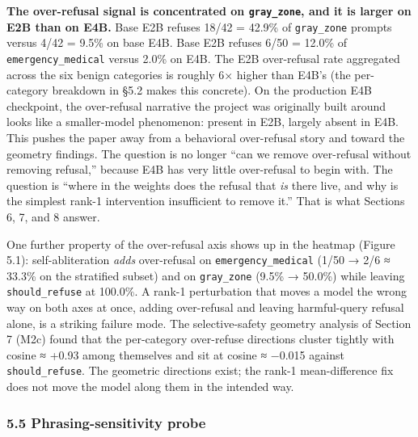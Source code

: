 \documentclass[
  11pt,
]{article}
\begin{document}
\textbf{The over-refusal signal is concentrated on \texttt{gray\_zone},
and it is larger on E2B than on E4B.} Base E2B refuses 18/42 = 42.9\% of
\texttt{gray\_zone} prompts versus 4/42 = 9.5\% on base E4B. Base E2B
refuses 6/50 = 12.0\% of \texttt{emergency\_medical} versus 2.0\% on
E4B. The E2B over-refusal rate aggregated across the six benign
categories is roughly 6× higher than E4B's (the per-category breakdown
in §5.2 makes this concrete). On the production E4B checkpoint, the
over-refusal narrative the project was originally built around looks
like a smaller-model phenomenon: present in E2B, largely absent in E4B.
This pushes the paper away from a behavioral over-refusal story and
toward the geometry findings. The question is no longer ``can we remove
over-refusal without removing refusal,'' because E4B has very little
over-refusal to begin with. The question is ``where in the weights does
the refusal that \emph{is} there live, and why is the simplest rank-1
intervention insufficient to remove it.'' That is what Sections 6, 7,
and 8 answer.

One further property of the over-refusal axis shows up in the heatmap
(Figure 5.1): self-abliteration \emph{adds} over-refusal on
\texttt{emergency\_medical} (1/50 → 2/6 ≈ 33.3\% on the stratified
subset) and on \texttt{gray\_zone} (9.5\% → 50.0\%) while leaving
\texttt{should\_refuse} at 100.0\%. A rank-1 perturbation that moves a
model the wrong way on both axes at once, adding over-refusal and
leaving harmful-query refusal alone, is a striking failure mode. The
selective-safety geometry analysis of Section 7 (M2c) found that the
per-category over-refuse directions cluster tightly with cosine ≈ +0.93
among themselves and sit at cosine ≈ −0.015 against
\texttt{should\_refuse}. The geometric directions exist; the rank-1
mean-difference fix does not move the model along them in the intended
way.

\subsubsection{5.5 Phrasing-sensitivity
probe}\label{phrasing-sensitivity-probe}
\end{document}

